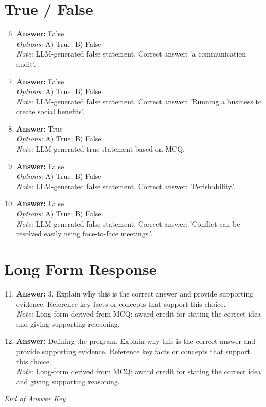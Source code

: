 \documentclass[12pt]{article}
\begin{document}
\section*{True / False}
\begin{enumerate}[label=\arabic*.]
\setcounter{enumi}{5}
\item \textbf{Answer:} False
\\ \textit{Options:} A) True; B) False
\\ \textit{Note:} LLM-generated false statement. Correct answer: 'a communication audit'.
\item \textbf{Answer:} False
\\ \textit{Options:} A) True; B) False
\\ \textit{Note:} LLM-generated false statement. Correct answer: 'Running a business to create social benefits'.
\item \textbf{Answer:} True
\\ \textit{Options:} A) True; B) False
\\ \textit{Note:} LLM-generated true statement based on MCQ.
\item \textbf{Answer:} False
\\ \textit{Options:} A) True; B) False
\\ \textit{Note:} LLM-generated false statement. Correct answer: 'Perishability.'.
\item \textbf{Answer:} False
\\ \textit{Options:} A) True; B) False
\\ \textit{Note:} LLM-generated false statement. Correct answer: 'Conflict can be resolved easily using face-to-face meetings.'.
\end{enumerate}

\section*{Long Form Response}
\begin{enumerate}[label=\arabic*.]
\setcounter{enumi}{10}
\item \textbf{Answer:} 3. Explain why this is the correct answer and provide supporting evidence. Reference key facts or concepts that support this choice.
\\ \textit{Note:} Long-form derived from MCQ; award credit for stating the correct idea and giving supporting reasoning.
\item \textbf{Answer:} Defining the program. Explain why this is the correct answer and provide supporting evidence. Reference key facts or concepts that support this choice.
\\ \textit{Note:} Long-form derived from MCQ; award credit for stating the correct idea and giving supporting reasoning.
\end{enumerate}

\vfill
\noindent\textit{End of Answer Key}
\end{document}
